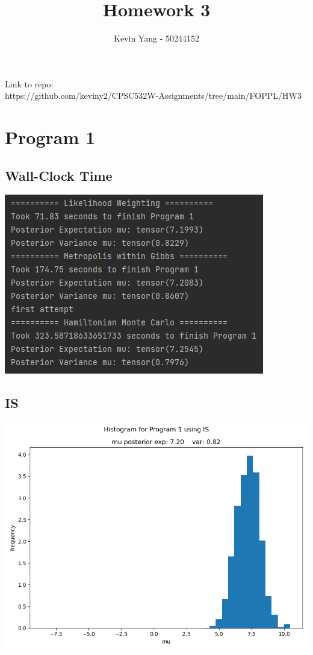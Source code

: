 \documentclass[10pt]{homeworg}
\title{Homework 3}
\author{Kevin Yang - 50244152}
\begin{document}
\maketitle

\Huge{Link to repo:}\\
\Large{https://github.com/keviny2/CPSC532W-Assignments/tree/main/FOPPL/HW3}


\section{Program 1}
\subsection{Wall-Clock Time}
\begin{center}
\includegraphics[scale=0.75]{figures/program_1_time.png}
\end{center}

\subsection{IS}
\begin{center}
\includegraphics[scale=0.4]{figures/IS_program_1.png}
\end{center}
\end{document}
